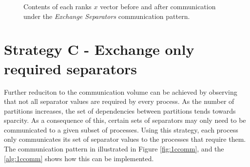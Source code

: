\begin{figure}[H]
    \centering
    \caption{Contents of each ranks \(x\) vector before and after communication under the \textit{Exchange Separators} communication pattern.}
    \label{fig:1bcomm}
\end{figure}






\section{Strategy C - Exchange only required separators}
Further reduciton to the communication volume can be achieved by observing that not all separator values are required by every process. As the number of partitions increases, the set of dependencies between partitions tends towards sparcity. As a consequence of this, certain sets of separators may only need to be communicated to a given subset of processes. Using this strategy, each process only communicates its set of separator values to the processes that require them. The communication pattern in illustrated in Figure \ref{fig:1ccomm}, and the \autoref{alg:1ccomm} shows how this can be implemented.


